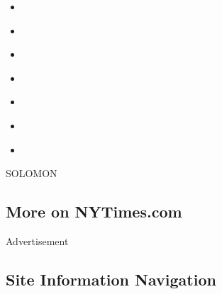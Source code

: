 \begin{itemize}
\tightlist
\item
  \href{https://www.nytimes3xbfgragh.onion/interactive/2019/10/09/magazine/tyler-perry-black-theater.html}{}
\item
  \href{https://www.nytimes3xbfgragh.onion/interactive/2019/10/09/magazine/kathryn-hahn-mrs-fletcher.html}{}
\item
  \href{https://www.nytimes3xbfgragh.onion/interactive/2019/10/08/magazine/black-women-artists-conversation.html}{}
\item
  \href{https://www.nytimes3xbfgragh.onion/interactive/2019/10/08/magazine/rosalia-flamenco.html}{}
\item
  \href{https://www.nytimes3xbfgragh.onion/interactive/2019/10/08/magazine/ben-lerner-topeka-school.html}{}
\item
  \href{https://www.nytimes3xbfgragh.onion/interactive/2019/10/08/magazine/susan-sontag.html}{}
\item
  \href{https://www.nytimes3xbfgragh.onion/interactive/2019/10/09/magazine/moma-reopening.html}{}
\end{itemize}

SOLOMON

\hypertarget{more-on-nytimescom}{%
\subsection{More on NYTimes.com}\label{more-on-nytimescom}}

Advertisement

\hypertarget{site-information-navigation}{%
\subsection{Site Information
Navigation}\label{site-information-navigation}}

